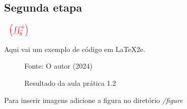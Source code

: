 \subsection{Segunda etapa}




$\underline{{\color{Blue} }}{\color{red} \, \: \: \left ( \iint_{\widetilde{ \theta }}^{\phi } \right )}  $



\par Aqui vai um exemplo de código em \LaTeX2e.


\begin{figure}[H] %
  \center
  \caption{Resultado da aula prática 1.2}

  \raggedright
  {\fontsize{10pt}{\baselineskip}\selectfont Fonte: O autor (2024)}
  \label{fig:ap1_cod_vigual1}
\end{figure}




Para inserir imagens adicione a figura no diretório \textit{/figure}


